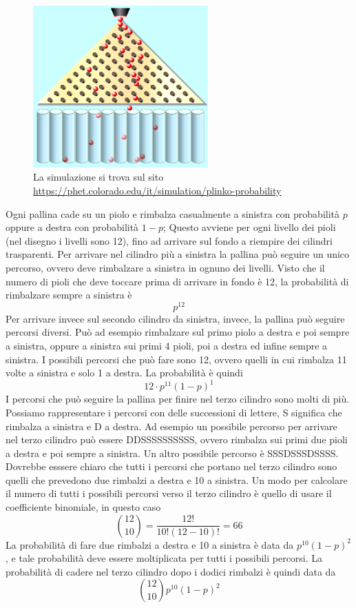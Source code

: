 \begin{figure}
  \begin{center}
    \includegraphics[width=0.6\textwidth]{img/griglia.png}
  \end{center}
  \caption{La simulazione si trova sul sito 
\href{https://phet.colorado.edu/it/simulation/plinko-probability}{
https://phet.colorado.edu/it/simulation/plinko-probability}}
\end{figure}

Ogni pallina cade su un piolo e rimbalza casualmente a sinistra con 
probabilità $p$ oppure a destra con probabilità $1-p$; Questo avviene per 
ogni livello dei pioli (nel disegno i livelli sono 12), fino ad arrivare sul 
fondo a riempire dei cilindri trasparenti.
Per arrivare nel cilindro più a sinistra la pallina può seguire un unico 
percorso, ovvero deve rimbalzare a sinistra in ognuno dei livelli. 
Visto che il numero di pioli che deve toccare prima di arrivare in fondo è 
12, la probabilità di rimbalzare sempre a sinistra è $$p^{12}$$
Per arrivare invece sul secondo cilindro da sinistra, invece, la pallina può 
seguire percorsi diversi. Può ad esempio rimbalzare sul primo piolo a destra 
e poi sempre a sinistra, oppure a sinistra sui primi 4 pioli, poi a destra ed 
infine sempre a sinistra. I possibili percorsi che può fare sono 12, ovvero 
quelli in cui rimbalza 11 volte a sinistra e solo 1 a destra. La probabilità 
è quindi
$$12 \cdot p^{11}(1-p)^1$$
I percorsi che può seguire la pallina per finire nel terzo cilindro sono 
molti di più. Possiamo rappresentare i percorsi con delle successioni di 
lettere, S significa che rimbalza a sinistra e D a destra. Ad esempio un 
possibile percorso per arrivare nel terzo cilindro può essere
DDSSSSSSSSSS, ovvero rimbalza sui primi due pioli a destra e poi sempre a 
sinistra. Un altro possibile percorso è SSSDSSSDSSSS. Dovrebbe esssere chiaro 
che tutti i percorsi che portano nel terzo cilindro sono quelli che prevedono 
due rimbalzi a destra e 10 a sinistra. Un modo per calcolare il numero di 
tutti i possibili percorsi verso il terzo cilindro è quello di usare il 
coefficiente binomiale, in questo caso
$$ \binom{12}{10}=\dfrac{12!}{10!(12-10)!}=66$$
La probabilità di fare due rimbalzi a destra e 10 a sinistra è data da
$p^{10}(1-p)^2$, e tale probabilità deve essere moltiplicata per tutti i 
possibili percorsi. La probabilità di cadere nel terzo cilindro dopo i dodici 
rimbalzi è quindi data da
$$ \binom{12}{10} p^{10}(1-p)^2$$

